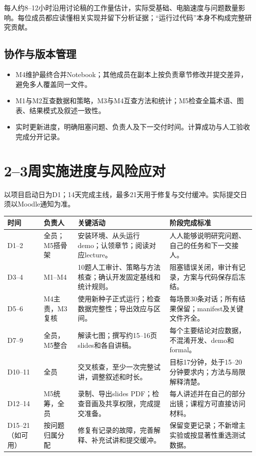 \documentclass[11pt,a4paper]{article}
\newcommand{\note}[1]{{\small\color{muted}#1\par}}
\newcommand{\pagetitle}[2]{\section{#1}\note{#2}}
\begin{document}
每人约8--12小时沿用讨论稿的工作量估计，实际受基础、电脑速度与问题数量影响。每位成员都应读懂相关实现并留下分析证据；“运行过代码”本身不构成完整研究贡献。

\subsection{协作与版本管理}
\begin{itemize}
\item M4维护最终合并Notebook；其他成员在副本上按负责章节修改并提交差异，避免多人覆盖同一文件。
\item M1与M2互查数据和策略，M3与M4互查方法和统计；M5检查全篇术语、图表、结果模式及叙述一致性。
\item 实时更新进度，明确阻塞问题、负责人及下一交付时间。计算成功与人工验收完成分开记录。
\end{itemize}

\newpage
\pagetitle{2--3周实施进度与风险应对}{以项目启动日为D1；14天完成主线，最多21天用于修复与交付缓冲。实际提交日须以Moodle通知为准。}
\begin{center}\small
\begin{tabularx}{\linewidth}{@{}p{22mm}p{24mm}YY@{}}\toprule
时间 & 负责人 & 关键活动 & 阶段完成标准 \\\midrule
D1--2 & 全员；M5搭骨架 & 安装环境、从头运行demo；认领章节；阅读对应lecture。 & 人人能够说明研究问题、自己的任务和下一交接人。\\
D3--4 & M1--M4 & 10题人工审计、策略与方法核查；确认开发固定基线和统计规则。 & 阻塞错误关闭，审计有记录，方案与代码保存后冻结。\\
D5--6 & M4主责，M3复核 & 使用新种子正式运行；检查数据完整性；导出效应与区间。 & 每场景30条对话；所有结果保留；manifest及关键文件齐全。\\
D7--9 & 全员，M5整合 & 解读七图；撰写约15--16页slides和各自讲稿。 & 每个主要结论对应数据，不混淆开发、demo和formal。\\
D10--11 & 全员 & 交叉核查，至少一次完整试讲，调整叙述和时长。 & 目标17分钟，处于15--20分钟要求内；方法与局限解释清楚。\\
D12--14 & M5统筹，全员 & 录制、导出slides PDF；检查音画及共享权限，完成提交准备。 & 每人讲述并在自己的部分出镜；课程方可直接访问材料。\\
D15--21\newline （如可用） & 按问题归属分配 & 修复有记录的故障，完善解释、补充试讲和提交缓冲。 & 保留变更记录；不新增主实验或按显著性重选测试数据。\\\bottomrule
\end{tabularx}\end{center}
\end{document}
